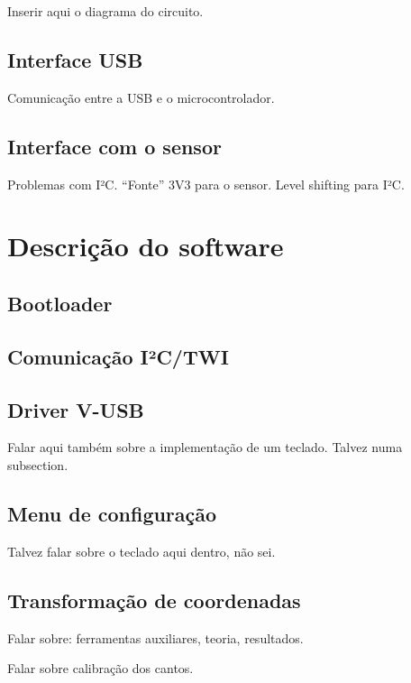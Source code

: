 \documentclass[brazil,pagestart=firstchapter]{abnt}
\begin{document}
Inserir aqui o diagrama do circuito.

\section{Interface USB\label{sec:hardware_usb}}

Comunicação entre a USB e o microcontrolador.

\section{Interface com o sensor\label{sec:hardware_sensor}}

Problemas com I²C. ``Fonte'' 3V3 para o sensor. Level shifting para I²C.


\chapter{Descrição do software\label{cap:software}}

\section{Bootloader\label{sec:bootloader}}

\section{Comunicação I²C/TWI\label{sec:twi}}

\section{Driver V-USB\label{sec:vusb}}

Falar aqui também sobre a implementação de um teclado. Talvez numa
subsection.

\section{Menu de configuração\label{sec:menu}}

Talvez falar sobre o teclado aqui dentro, não sei.

\section{Transformação de coordenadas\label{sec:coordenadas}}

Falar sobre: ferramentas auxiliares, teoria, resultados.

Falar sobre calibração dos cantos.
\end{document}

